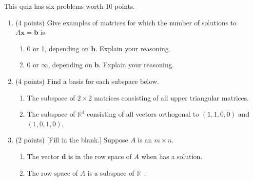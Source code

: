 \documentclass[11pt,fleqn]{article}
\begin{document}
\renewcommand{\headrulewidth}{0pt}
\newcommand{\blank}[1]{\rule{#1}{0.75pt}}
\renewcommand{\d}{\displaystyle}

This quiz has six problems worth 10 points.
\begin{enumerate}
\item (4 points) Give examples of matrices for which the number of solutions to $A \mathbf{x} = \mathbf{b}$ is
	\begin{enumerate}
	\item 0 or 1, depending on $\mathbf{b}.$ Explain your reasoning.
	\vfill
	\item 0 or $\infty$,  depending on $\mathbf{b}.$ Explain your reasoning.
	\vfill
	\end{enumerate}
\item (4 points) Find a basis for each subspace below.
	\begin{enumerate}
	\item The subspace of $2 \times 2$ matrices consisting of all upper triangular matrices.
	\vfill
	\item The subspace of $\mathbb{R}^4$ consisting of all vectors orthogonal to $(1,1,0,0)$ and $(1,0,1,0).$	
	\vfill
	\end{enumerate}
\item (2 points) [Fill in the blank.] Suppose $A$ is an $m \times n.$
	\begin{enumerate}
	\item The vector $\textbf{d}$ is in the row space of $A$ when \underline{\hspace{1in}} has a solution. \\
	\item The row space of $A$ is a subspace of $\mathbb{R}^{\boxed{\phantom{n}}}.$
	\end{enumerate}
\end{enumerate}
\end{document}

